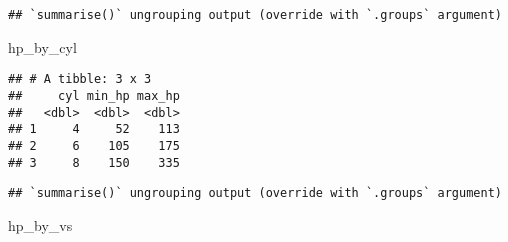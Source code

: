 \documentclass[
]{article}
\newenvironment{Shaded}{\begin{snugshade}}{\end{snugshade}}
\newcommand{\DataTypeTok}[1]{\textcolor[rgb]{0.13,0.29,0.53}{#1}}
\newcommand{\KeywordTok}[1]{\textcolor[rgb]{0.13,0.29,0.53}{\textbf{#1}}}
\newcommand{\NormalTok}[1]{#1}
\newcommand{\OperatorTok}[1]{\textcolor[rgb]{0.81,0.36,0.00}{\textbf{#1}}}
\newcommand{\StringTok}[1]{\textcolor[rgb]{0.31,0.60,0.02}{#1}}
\begin{document}
\begin{Shaded}
\end{Shaded}

\begin{verbatim}
## `summarise()` ungrouping output (override with `.groups` argument)
\end{verbatim}

\begin{Shaded}
\begin{Highlighting}[]
\NormalTok{hp_by_cyl}
\end{Highlighting}
\end{Shaded}

\begin{verbatim}
## # A tibble: 3 x 3
##     cyl min_hp max_hp
##   <dbl>  <dbl>  <dbl>
## 1     4     52    113
## 2     6    105    175
## 3     8    150    335
\end{verbatim}

\begin{Shaded}
\end{Shaded}

\begin{verbatim}
## `summarise()` ungrouping output (override with `.groups` argument)
\end{verbatim}

\begin{Shaded}
\begin{Highlighting}[]
\NormalTok{hp_by_vs}
\end{Highlighting}
\end{Shaded}
\end{document}
